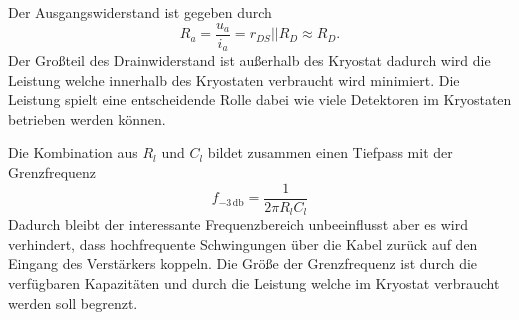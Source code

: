 Der Ausgangswiderstand ist gegeben durch
\begin{equation}
R_a = \frac{u_a}{i_a} = r_{DS}||R_D \approx R_D.
\end{equation}
Der Großteil des Drainwiderstand ist außerhalb des Kryostat dadurch wird die Leistung welche innerhalb des Kryostaten verbraucht wird minimiert.
Die Leistung spielt eine entscheidende Rolle dabei wie viele Detektoren im Kryostaten betrieben werden können.

Die Kombination aus $R_l$ und $C_l$ bildet zusammen einen Tiefpass mit der Grenzfrequenz
\begin{equation}
f_{-3\,\mathrm{db}} = \frac{1}{2\pi R_l C_l}
\end{equation}
Dadurch bleibt der interessante Frequenzbereich unbeeinflusst aber es wird verhindert, dass hochfrequente Schwingungen über die Kabel zurück auf den Eingang des Verstärkers koppeln.
Die Größe der Grenzfrequenz ist durch die verfügbaren Kapazitäten und durch die Leistung welche im Kryostat verbraucht werden soll begrenzt.

